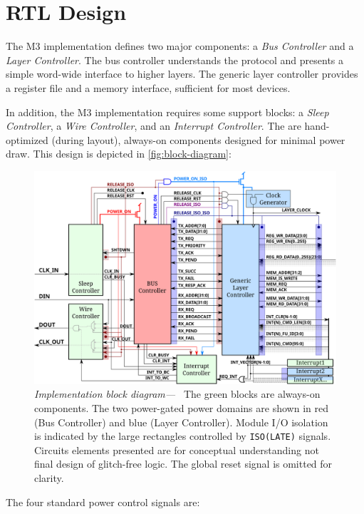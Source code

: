 \section{RTL Design}

The M3 \bus implementation defines two major components:
a {\em Bus Controller} and a {\em Layer Controller}.
The bus controller understands the \bus protocol and presents a simple
word-wide interface to higher layers. The generic layer controller provides a
register file and a memory interface, sufficient for most devices.

In addition, the M3 \bus implementation requires some support blocks:
a {\em Sleep Controller}, a {\em Wire Controller},
and an {\em Interrupt Controller}.
The are hand-optimized (during layout), always-on components designed for
minimal power draw.
This design is depicted in \autoref{fig:block-diagram}:

\begin{figure}[!ht]
\centering
\includegraphics[width=\linewidth]{img/block_diagram}
\caption{{\em Implementation block diagram---~}%
The green blocks are always-on components.
The two power-gated power domains are shown in red
(Bus Controller) and blue (Layer Controller).
Module I/O isolation is indicated by the large rectangles controlled by
{\tt ISO(LATE)} signals.
Circuits elements presented are for conceptual understanding not final design
of glitch-free logic. The global reset signal is omitted for clarity.}
\label{fig:block-diagram}
\end{figure}

The four standard power control signals are:


